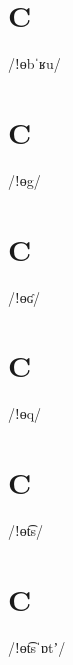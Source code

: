 \documentclass[10pt,a4paper,twoside]{book}
\begin{document}
\section*{C}

\begin{multicols}{3}
 {/ǃɵbˈʁu/} {}
\end{multicols}

\section*{C}

\begin{multicols}{3}
 {/ǃɵg/} {}
\end{multicols}

\section*{C}

\begin{multicols}{3}
 {/ǃɵʛ/} {}
\end{multicols}

\section*{C}

\begin{multicols}{3}
 {/ǃɵq/} {}
\end{multicols}

\section*{C}

\begin{multicols}{3}
 {/ǃɵt͡s/} {}
\end{multicols}

\section*{C}

\begin{multicols}{3}
 {/ǃɵt͡sˈɒtʼ/} {}
\end{multicols}
\end{document}
